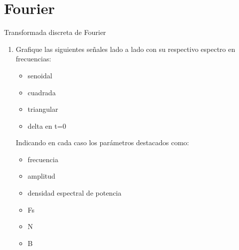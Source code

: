 \section{Fourier}
 \begin{frame}{Transformada discreta de Fourier}
    \begin{enumerate}
       \item{Grafique las siguientes señales lado a lado con su respectivo espectro en frecuencias:}
    \begin{itemize}
       \item{senoidal}
       \item{cuadrada}
       \item{triangular}
       \item{delta en t=0}
    \end{itemize}
 Indicando en cada caso los parámetros destacados como:
    \begin{itemize}
       \item{frecuencia}
       \item{amplitud}
       \item{densidad espectral de potencia}
       \item{Fs}
       \item{N}
       \item{B}
    \end{itemize}
    \end{enumerate}
 \end{frame}
